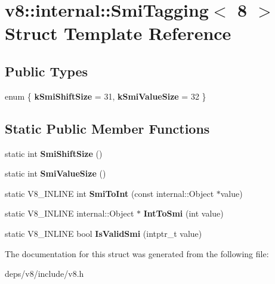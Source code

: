 \hypertarget{structv8_1_1internal_1_1_smi_tagging_3_018_01_4}{}\section{v8\+:\+:internal\+:\+:Smi\+Tagging$<$ 8 $>$ Struct Template Reference}
\label{structv8_1_1internal_1_1_smi_tagging_3_018_01_4}
\subsection*{Public Types}
\begin{DoxyCompactItemize}
\item 
\hypertarget{structv8_1_1internal_1_1_smi_tagging_3_018_01_4_aec48ea556ba2a9534a5ed83443a53764}{}enum \{ {\bfseries k\+Smi\+Shift\+Size} = 31, 
{\bfseries k\+Smi\+Value\+Size} = 32
 \}\label{structv8_1_1internal_1_1_smi_tagging_3_018_01_4_aec48ea556ba2a9534a5ed83443a53764}

\end{DoxyCompactItemize}
\subsection*{Static Public Member Functions}
\begin{DoxyCompactItemize}
\item 
\hypertarget{structv8_1_1internal_1_1_smi_tagging_3_018_01_4_a4fb28f586fdee8316a03f9b8f94b945d}{}static int {\bfseries Smi\+Shift\+Size} ()\label{structv8_1_1internal_1_1_smi_tagging_3_018_01_4_a4fb28f586fdee8316a03f9b8f94b945d}

\item 
\hypertarget{structv8_1_1internal_1_1_smi_tagging_3_018_01_4_a836e783af92beb7ca9cc8cdabef43ab2}{}static int {\bfseries Smi\+Value\+Size} ()\label{structv8_1_1internal_1_1_smi_tagging_3_018_01_4_a836e783af92beb7ca9cc8cdabef43ab2}

\item 
\hypertarget{structv8_1_1internal_1_1_smi_tagging_3_018_01_4_a040db1ceee3195c2463075b7b50cfda0}{}static V8\+\_\+\+I\+N\+L\+I\+N\+E int {\bfseries Smi\+To\+Int} (const internal\+::\+Object $\ast$value)\label{structv8_1_1internal_1_1_smi_tagging_3_018_01_4_a040db1ceee3195c2463075b7b50cfda0}

\item 
\hypertarget{structv8_1_1internal_1_1_smi_tagging_3_018_01_4_a1926f38e35fc98fe244e8136180d70f2}{}static V8\+\_\+\+I\+N\+L\+I\+N\+E internal\+::\+Object $\ast$ {\bfseries Int\+To\+Smi} (int value)\label{structv8_1_1internal_1_1_smi_tagging_3_018_01_4_a1926f38e35fc98fe244e8136180d70f2}

\item 
\hypertarget{structv8_1_1internal_1_1_smi_tagging_3_018_01_4_a5ab93d4cf7c3b9ceff5116b3598a1f94}{}static V8\+\_\+\+I\+N\+L\+I\+N\+E bool {\bfseries Is\+Valid\+Smi} (intptr\+\_\+t value)\label{structv8_1_1internal_1_1_smi_tagging_3_018_01_4_a5ab93d4cf7c3b9ceff5116b3598a1f94}

\end{DoxyCompactItemize}


The documentation for this struct was generated from the following file\+:\begin{DoxyCompactItemize}
\item 
deps/v8/include/v8.\+h\end{DoxyCompactItemize}
